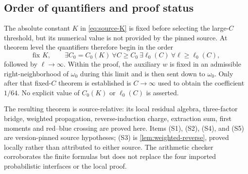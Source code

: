 \subsection{Order of quantifiers and proof status}

The absolute constant \(K\) in \eqref{eq:source-K} is fixed before selecting the
large-\(C\) threshold, but its numerical value is not provided by the pinned
source.  At theorem level the quantifiers therefore begin in the order
\[
 \text{fix }K,\qquad
 \exists C_0=C_0(K)\ \forall C\ge C_0\ \exists\ell_0(C)\
 \forall\ell\ge\ell_0(C),
\tag{B.7}
\]
followed by \(\ell\to\infty\).  Within the proof, the auxiliary \(w\) is
fixed in an admissible right-neighborhood of \(\omega_0\) during this limit
and is then sent down to \(\omega_0\).  Only after that fixed-\(C\) theorem is
established is \(C\to\infty\) used to obtain the coefficient \(1/64\).
No explicit value of \(C_0(K)\) or \(\ell_0(C)\) is asserted.

The resulting theorem is source-relative: its local residual algebra,
three-factor bridge, weighted propagation, reverse-induction charge,
extraction sum, first moments and red--blue crossing are proved here.  Items
(S1), (S2), (S4), and (S5) are version-pinned source hypotheses; (S3) is
\cref{lem:weighted-reverse}, proved locally rather than attributed to either
source.  The arithmetic checker corroborates the finite formulas but does not
replace the four imported probabilistic interfaces or the local proof.
